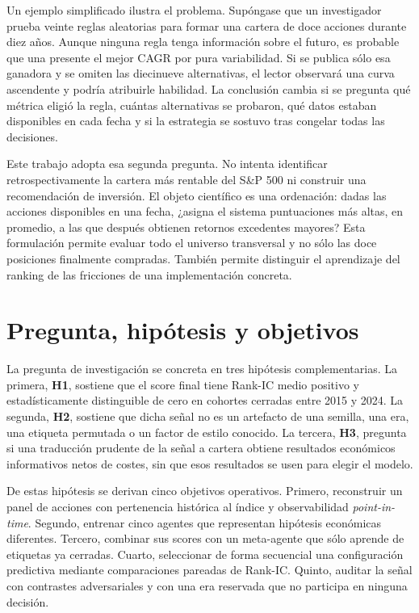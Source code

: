 Un ejemplo simplificado ilustra el problema. Supóngase que un investigador prueba veinte reglas
aleatorias para formar una cartera de doce acciones durante diez años. Aunque ninguna regla tenga
información sobre el futuro, es probable que una presente el mejor CAGR por pura variabilidad. Si se
publica sólo esa ganadora y se omiten las diecinueve alternativas, el lector observará una curva
ascendente y podría atribuirle habilidad. La conclusión cambia si se pregunta qué métrica eligió la
regla, cuántas alternativas se probaron, qué datos estaban disponibles en cada fecha y si la
estrategia se sostuvo tras congelar todas las decisiones.

Este trabajo adopta esa segunda pregunta. No intenta identificar retrospectivamente la cartera más
rentable del S\&P 500 ni construir una recomendación de inversión. El objeto científico es una
ordenación: dadas las acciones disponibles en una fecha, ¿asigna el sistema puntuaciones más altas,
en promedio, a las que después obtienen retornos excedentes mayores? Esta formulación permite
evaluar todo el universo transversal y no sólo las doce posiciones finalmente compradas. También
permite distinguir el aprendizaje del ranking de las fricciones de una implementación concreta.

\section{Pregunta, hipótesis y objetivos}

La pregunta de investigación se concreta en tres hipótesis complementarias. La primera,
\textbf{H1}, sostiene que el score final tiene Rank-IC medio positivo y estadísticamente distinguible
de cero en cohortes cerradas entre 2015 y 2024. La segunda, \textbf{H2}, sostiene que dicha señal no
es un artefacto de una semilla, una era, una etiqueta permutada o un factor de estilo conocido. La
tercera, \textbf{H3}, pregunta si una traducción prudente de la señal a cartera obtiene resultados
económicos informativos netos de costes, sin que esos resultados se usen para elegir el modelo.

De estas hipótesis se derivan cinco objetivos operativos. Primero, reconstruir un panel de acciones
con pertenencia histórica al índice y observabilidad \textit{point-in-time}. Segundo, entrenar cinco
agentes que representan hipótesis económicas diferentes. Tercero, combinar sus scores con un
meta-agente que sólo aprende de etiquetas ya cerradas. Cuarto, seleccionar de forma secuencial una
configuración predictiva mediante comparaciones pareadas de Rank-IC. Quinto, auditar la señal con
contrastes adversariales y con una era reservada que no participa en ninguna decisión.

